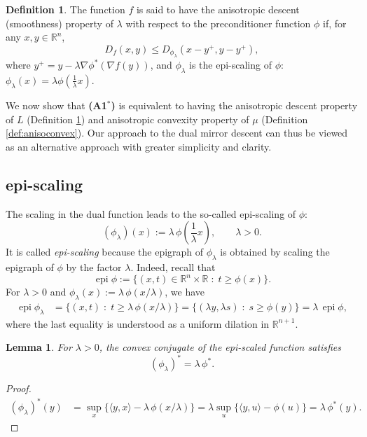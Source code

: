 \documentclass{article}
\theoremstyle{plain}
\newtheorem{lemma}[theorem]{Lemma}
\theoremstyle{definition}
\newtheorem{definition}[theorem]{Definition}
\theoremstyle{remark}
\begin{document}
\begin{definition}\label{def:anisosmooth}
    The function $f$ is said to have the anisotropic descent (smoothness) property of $\lambda$ with respect to the preconditioner function $\phi$ if, for any $x,y\in\mathbb{R}^n$, 
    \begin{equation}
    D_f(x,y)\leq D_{\phi_{\lambda}}(x-y^+,y-y^+),
    \end{equation}
    where $y^+ = y-\lambda\nabla \phi^*(\nabla f(y))$, and $\phi_{\lambda}$ is the epi-scaling of $\phi$: $\phi_{\lambda}(x) = \lambda\phi(\frac{1}{\lambda}x)$.
\end{definition}

We now show that \textbf{(A1$^*$)} is equivalent to having the anisotropic descent property of $L$ (Definition \ref{def:anisosmooth}) and anisotropic convexity property of $\mu$ (Definition \ref{def:anisoconvex}). Our approach to the dual mirror descent can thus be viewed as an alternative approach with greater simplicity and clarity.

\subsection{epi-scaling}
The scaling in the dual function leads to the so-called epi-scaling of $\phi$:
\[
(\phi_{\lambda})(x):=\lambda\,\phi\!\left(\frac{1}{\lambda}x\right),\qquad \lambda>0.
\]
It is called \emph{epi-scaling} because the epigraph of $\phi_\lambda$ is obtained
by scaling the epigraph of $\phi$ by the factor $\lambda$. Indeed, recall that
\[
\operatorname{epi}\phi
:=\{(x,t)\in\mathbb{R}^n\times\mathbb{R}\;:\; t\ge \phi(x)\}.
\]
For $\lambda>0$ and $\phi_\lambda(x):=\lambda\,\phi(x/\lambda)$, we have
\[
\begin{aligned}
\operatorname{epi}\phi_\lambda
&=\{(x,t)\;:\; t\ge \lambda\,\phi(x/\lambda)\} =\{(\lambda y,\lambda s)\;:\; s\ge \phi(y)\} =\lambda\,\operatorname{epi}\phi,
\end{aligned}
\]
where the last equality is understood as a uniform dilation in
$\mathbb{R}^{n+1}$.

\begin{lemma}\label{lem:epi-scaling-conjugate}
For $\lambda>0$, the convex conjugate of the epi-scaled function satisfies
\[
(\phi_{\lambda})^* = \lambda\,\phi^*.
\]
\end{lemma}
\begin{proof}
\[
\begin{aligned}
(\phi_{\lambda})^*(y)
&= \sup_{x}\Big\{\langle y,x\rangle - \lambda\,\phi(x/\lambda)\Big\}
 = \lambda \sup_{u}\Big\{\langle y,u\rangle - \phi(u)\Big\}
= \lambda\,\phi^*(y).
\end{aligned}
\]
\end{proof}
\end{document}
